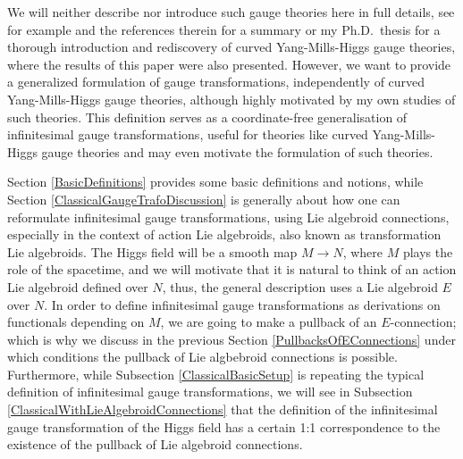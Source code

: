 \documentclass[CM,GP]{degruyter-crelle}       %
\theoremstyle{plain}
\theoremstyle{remark}
\theoremstyle{definition}
\begin{document}
We will neither describe nor introduce such gauge theories here in full details, see for example \cite{CurvedYMH} and the references therein for a summary or my Ph.D.~thesis \cite{MyThesis} for a thorough introduction and rediscovery of curved Yang-Mills-Higgs gauge theories, where the results of this paper were also presented. However, we want to provide a generalized formulation of gauge transformations, independently of curved Yang-Mills-Higgs gauge theories, although highly motivated by my own studies of such theories. This definition serves as a coordinate-free generalisation of infinitesimal gauge transformations, useful for theories like curved Yang-Mills-Higgs gauge theories and may even motivate the formulation of such theories.

Section \ref{BasicDefinitions} provides some basic definitions and notions, while Section \ref{ClassicalGaugeTrafoDiscussion} is generally about how one can reformulate infinitesimal gauge transformations, using Lie algebroid connections, especially in the context of action Lie algebroids, also known as transformation Lie algebroids. The Higgs field will be a smooth map $M \to N$, where $M$ plays the role of the spacetime, and we will motivate that it is natural to think of an action Lie algebroid defined over $N$, thus, the general description uses a Lie algebroid $E$ over $N$. In order to define infinitesimal gauge transformations as derivations on functionals depending on $M$, we are going to make a pullback of an $E$-connection; which is why we discuss in the previous Section \ref{PullbacksOfEConnections} under which conditions the pullback of Lie algbebroid connections is possible. Furthermore, while Subsection \ref{ClassicalBasicSetup} is repeating the typical definition of infinitesimal gauge transformations, we will see in Subsection \ref{ClassicalWithLieAlgebroidConnections} that the definition of the infinitesimal gauge transformation of the Higgs field has a certain 1:1 correspondence to the existence of the pullback of Lie algebroid connections.
\end{document}
